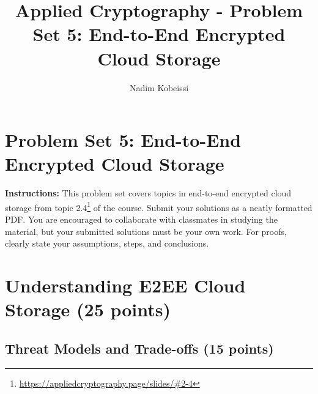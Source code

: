 \documentclass[10pt,a4paper,american]{exam}
\title{Applied Cryptography - Problem Set 5: End-to-End Encrypted Cloud Storage}
\author{Nadim Kobeissi}
\begin{document}
\classhandoutheader
\section*{Problem Set 5: End-to-End Encrypted Cloud Storage}

\begin{tcolorbox}[colframe=OliveGreen!30!white,colback=OliveGreen!5!white]
	\textbf{Instructions:} This problem set covers topics in end-to-end encrypted cloud storage from topic 2.4\footnote{\url{https://appliedcryptography.page/slides/\#2-4}} of the course. Submit your solutions as a neatly formatted PDF. You are encouraged to collaborate with classmates in studying the material, but your submitted solutions must be your own work. For proofs, clearly state your assumptions, steps, and conclusions.
\end{tcolorbox}

\section{Understanding E2EE Cloud Storage (25 points)}

\subsection{Threat Models and Trade-offs (15 points)}
\end{document}
